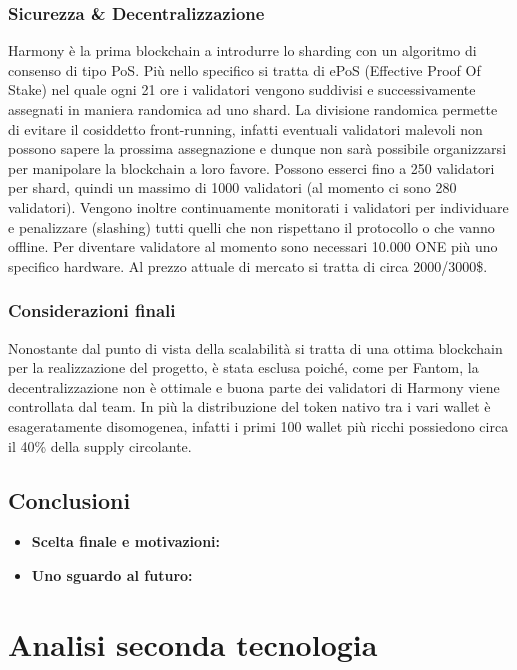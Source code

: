 \documentclass[a4paper, 12pt]{article}
\begin{document}
\subsubsection*{Sicurezza \& Decentralizzazione}
Harmony è la prima blockchain a introdurre lo sharding con un algoritmo di consenso di tipo PoS. Più nello specifico si tratta di ePoS (Effective Proof Of Stake) nel quale ogni 21 ore i validatori vengono suddivisi e successivamente assegnati in maniera randomica  ad uno shard. La divisione randomica permette di evitare il cosiddetto front-running, infatti eventuali validatori malevoli non possono sapere la prossima assegnazione e dunque non sarà possibile organizzarsi per manipolare la blockchain a loro favore.
Possono esserci fino a 250 validatori per shard, quindi un massimo di 1000 validatori (al momento ci sono 280 validatori).
Vengono inoltre continuamente monitorati i validatori per individuare e penalizzare (slashing) tutti quelli che non rispettano il protocollo o che vanno offline.
Per diventare validatore al momento sono necessari 10.000 ONE più uno specifico hardware. Al prezzo attuale di mercato si tratta di circa 2000/3000\$.
\subsubsection*{Considerazioni finali}
Nonostante dal punto di vista della scalabilità si tratta di una ottima blockchain per la realizzazione del progetto, è stata esclusa poiché, come per Fantom, la decentralizzazione non è ottimale e buona parte dei validatori di Harmony viene controllata dal team. In più la distribuzione del token nativo tra i vari wallet è esageratamente disomogenea, infatti i primi 100 wallet più ricchi possiedono circa il 40\% della supply circolante.

\newpage
\subsection*{Conclusioni}
\begin{itemize}

    \item \textbf{Scelta finale e motivazioni: }

    \item \textbf{Uno sguardo al futuro: }

\end{itemize}

\section{Analisi seconda tecnologia}
\end{document}
